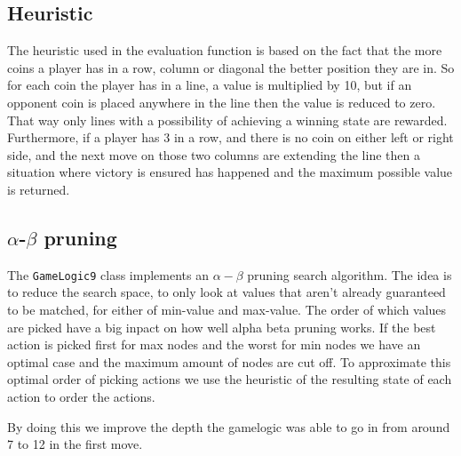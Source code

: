 \subsection{Heuristic}
The heuristic used in the evaluation function is based on the fact that the more coins a player has in a row, column or diagonal the better position they are in. So for each coin the player has in a line, a value is multiplied by 10, but if an opponent coin is placed anywhere in the line then the value is reduced to zero. That way only lines with a possibility of achieving a winning state are rewarded. Furthermore, if a player has 3 in a row, and there is no coin on either left or right side, and the next move on those two columns are extending the line then a situation where victory is ensured has happened and the maximum possible value is returned.

\subsection{$\alpha$-$\beta$ pruning}
The \texttt{GameLogic9} class implements an $\alpha-\beta$ pruning search algorithm. The idea is to reduce the search space, to only look at values that aren't already guaranteed to be matched, for either of min-value and max-value. The order of which values are picked have a big inpact on how well alpha beta pruning works. If the best action is picked first for max nodes and the worst for min nodes we have an optimal case and the maximum amount of nodes are cut off. To approximate this optimal order of picking actions we use the heuristic of the resulting state of each action to order the actions. 

By doing this we improve the depth the gamelogic was able to go in from around 7 to 12 in the first move.